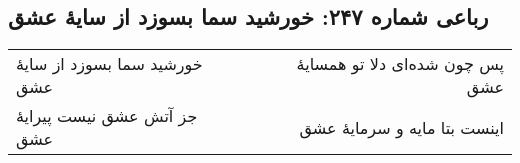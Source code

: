 \begin{center}
\section*{رباعی شماره ۲۴۷: خورشید سما بسوزد از سایهٔ عشق}
\label{sec:sh247}
\begin{longtable}{l p{0.5cm} r}
خورشید سما بسوزد از سایهٔ عشق
&&
پس چون شده‌ای دلا تو همسایهٔ عشق
\\
جز آتش عشق نیست پیرایهٔ عشق
&&
اینست بتا مایه و سرمایهٔ عشق
\\
\end{longtable}
\end{center}
